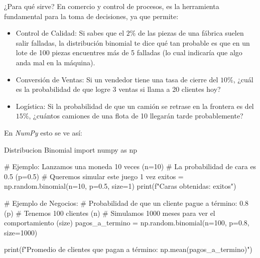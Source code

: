 ¿Para qué sirve?  En comercio y control de procesos, es la herramienta fundamental para la toma de decisiones, ya que permite:
\begin{itemize}
    \item Control de Calidad: Si sabes que el \(2\%\) de las piezas de una fábrica suelen salir falladas, la distribución binomial te dice qué tan probable es que en un lote de 100 piezas encuentres más de 5 falladas (lo cual indicaría que algo anda mal en la máquina).
    \item Conversión de Ventas: Si un vendedor tiene una tasa de cierre del \(10\%\), ¿cuál es la probabilidad de que logre 3 ventas si llama a 20 clientes hoy?
    \item Logística: Si la probabilidad de que un camión se retrase en la frontera es del \(15\%\), ¿cuántos camiones de una flota de 10 llegarán tarde probablemente?
\end{itemize}
    

En \textit{NumPy }esto se ve así:
\begin{pycode}{Distribucion Binomial}
import numpy as np

# Ejemplo: Lanzamos una moneda 10 veces (n=10)
# La probabilidad de cara es 0.5 (p=0.5)
# Queremos simular este juego 1 vez
exitos = np.random.binomial(n=10, p=0.5, size=1) 
print(f"Caras obtenidas: {exitos}")

# Ejemplo de Negocios:
# Probabilidad de que un cliente pague a término: 0.8 (p)
# Tenemos 100 clientes (n)
# Simulamos 1000 meses para ver el comportamiento (size)
pagos_a_termino = np.random.binomial(n=100, p=0.8, size=1000)

print(f"Promedio de clientes que pagan a término: {np.mean(pagos_a_termino)}")
\end{pycode}